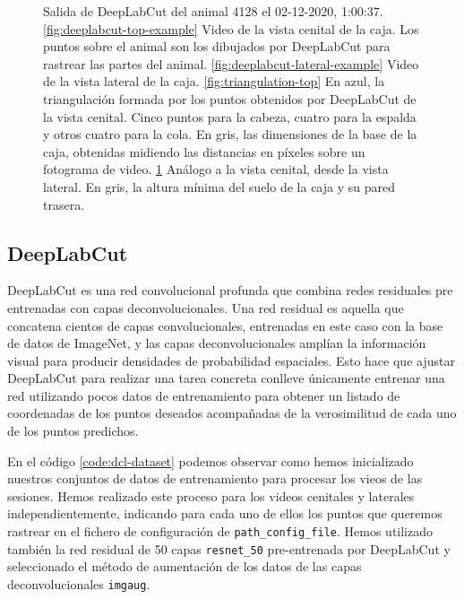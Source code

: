 \begin{figure}[p]
\begin{subfigure}{0.45\textwidth}
    \caption{}
    \label{fig:triangulation-lateral}
  \end{subfigure}
  \caption[Salida de DeepLabCut.]
  {Salida de DeepLabCut del animal 4128 el 02-12-2020, 1:00:37. \ref{fig:deeplabcut-top-example} Video de la vista cenital de la caja. Los puntos sobre el animal son los dibujados por DeepLabCut para rastrear las partes del animal. \ref{fig:deeplabcut-lateral-example} Video de la vista lateral de la caja. \ref{fig:triangulation-top} En azul, la triangulación formada por los puntos obtenidos por DeepLabCut de la vista cenital. Cinco puntos para la cabeza, cuatro para la espalda y otros cuatro para la cola. En gris, las dimensiones de la base de la caja, obtenidas midiendo las distancias en píxeles sobre un fotograma de video. \ref{fig:triangulation-lateral} Análogo a la vista cenital, desde la vista lateral. En gris, la altura mínima del suelo de la caja y su pared trasera.}

  \label{fig:deeplabcut-outputexamples}
\end{figure}

\subsection{DeepLabCut}\label{sec:DeepLabCut}
DeepLabCut es una red convolucional profunda que combina redes residuales pre entrenadas con capas deconvolucionales. Una red residual es aquella que concatena cientos de capas convolucionales, entrenadas en este caso con la base de datos de ImageNet, y las capas deconvolucionales amplían la información visual para producir densidades de probabilidad espaciales. Esto hace que ajustar DeepLabCut para realizar una tarea concreta conlleve únicamente entrenar una red utilizando pocos datos de entrenamiento para obtener un listado de coordenadas de los puntos deseados acompañadas de la verosimilitud de cada uno de los puntos predichos.

En el código \ref{code:dcl-dataset} podemos observar como hemos inicializado nuestros conjuntos de datos de entrenamiento para procesar los vieos de las sesiones. Hemos realizado este proceso para los videos cenitales y laterales independientemente, indicando para cada uno de ellos los puntos que queremos rastrear en el fichero de configuración de \texttt{path\_config\_file}. Hemos utilizado también la red residual de 50 capas \texttt{resnet\_50} pre-entrenada por DeepLabCut y seleccionado el método de aumentación de los datos de las capas deconvolucionales \texttt{imgaug}.

